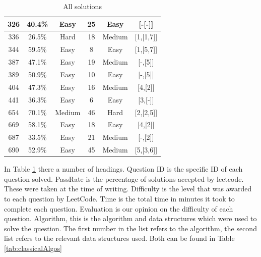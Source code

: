 \documentclass[10pt,twocolumn,hidelinks]{IEEEtran}
\begin{document}
\begin{table}[t]
\begin{tabular}{|c| c| c| c| c| c|}
  	\hline
 	326 & 40.4\% &Easy  &25  &Easy&[-[-]]\\
   	\hline
  	336 & 26.5\% &Hard &18  &Medium&[1,[1,7]]\\
  	\hline
 	344 & 59.5\% &Easy  &8  &Easy&[1,[5,7]]\\
  	\hline
 	387 & 47.1\% &Easy  & 19 &Medium&[-,[5]]\\
  	\hline
 	389 & 50.9\% &Easy  & 10 &Easy& [-,[5]]\\
  	\hline
 	404 & 47.3\% &Easy  &16  &Medium&[4,[2]]\\
	\hline
 	441 & 36.3\% &Easy  &6&Easy &[3,[-]]\\ 	
  	\hline
 	654 & 70.1\% &Medium  &46  &Hard&[2,[2,5]]\\
  	\hline
	669 &  58.1\%& Easy &18  &Easy&[4,[2]]\\
  	\hline
	687 &  33.5\%& Easy &21  &Medium&[-,[2]]\\
  	\hline
 	690 &  52.9\%& Easy &   45&Medium&[5,[3,6]]\\[1ex]
 	\hline
\end{tabular}
\caption{All solutions}
\label{tab:tabSols}
\end{table}
\par In Table \ref{tab:tabSols} there a number of headings. Question ID is the specific ID of each question solved. PassRate is the percentage of solutions accepted by leetcode. These were taken at the time of writing. Difficulty is the level that was awarded to each question by LeetCode. Time is the total time in minutes it took to complete each question. Evaluation is our opinion on the difficulty of each question. Algorithm, this is the algorithm and data structures which were used to solve the question. The first number in the list refers to the algorithm, the second list refers to the relevant data structures used. Both can be found in Table {\ref{tab:classicalAlgos}}
\end{document}
